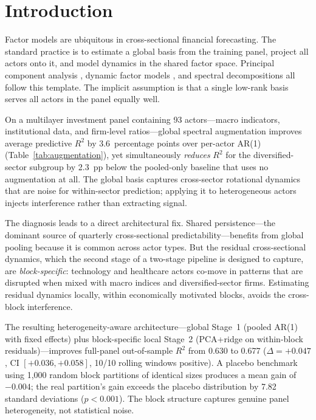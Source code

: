 \documentclass[11pt,a4paper]{article}
\begin{document}
\newpage

\section{Introduction}
\label{sec:intro}

Factor models are ubiquitous in cross-sectional financial forecasting. The standard practice is to estimate a global basis from the training panel, project all actors onto it, and model dynamics in the shared factor space. Principal component analysis \citep{stock2002forecasting,bai2002determining}, dynamic factor models \citep{doz2012quasi}, and spectral decompositions \citep{schmid2010dynamic} all follow this template. The implicit assumption is that a single low-rank basis serves all actors in the panel equally well.

On a multilayer investment panel containing 93 actors---macro indicators, institutional data, and firm-level ratios---global spectral augmentation improves average predictive $R^2$ by 3.6~percentage points over per-actor AR(1) (Table~\ref{tab:augmentation}), yet simultaneously \emph{reduces} $R^2$ for the diversified-sector subgroup by 2.3~pp below the pooled-only baseline that uses no augmentation at all. The global basis captures cross-sector rotational dynamics that are noise for within-sector prediction; applying it to heterogeneous actors injects interference rather than extracting signal.

The diagnosis leads to a direct architectural fix. Shared persistence---the dominant source of quarterly cross-sectional predictability---benefits from global pooling because it is common across actor types. But the residual cross-sectional dynamics, which the second stage of a two-stage pipeline is designed to capture, are \emph{block-specific}: technology and healthcare actors co-move in patterns that are disrupted when mixed with macro indices and diversified-sector firms. Estimating residual dynamics locally, within economically motivated blocks, avoids the cross-block interference.

The resulting heterogeneity-aware architecture---global Stage~1 (pooled AR(1) with fixed effects) plus block-specific local Stage~2 (PCA+ridge on within-block residuals)---improves full-panel out-of-sample $R^2$ from 0.630 to 0.677 ($\Delta = +0.047$, CI $[+0.036, +0.058]$, 10/10 rolling windows positive). A placebo benchmark using 1{,}000 random block partitions of identical sizes produces a mean gain of $-0.004$; the real partition's gain exceeds the placebo distribution by 7.82 standard deviations ($p < 0.001$). The block structure captures genuine panel heterogeneity, not statistical noise.
\end{document}
